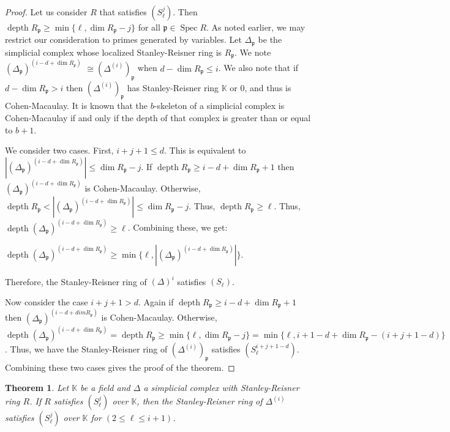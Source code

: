 \documentclass[11pt]{amsart}
\numberwithin{equation}{section}
\newtheorem{theorem}{Theorem}[section]
\theoremstyle{definition}
\theoremstyle{remark}
\newcommand{\Spec}{\operatorname{Spec}}
\newcommand{\depth}{\operatorname{depth}}
\begin{document}
\begin{proof}

Let us consider $R$ that satisfies $(S_\ell^j)$.  Then $\depth R _\mathfrak{p} \geq \min \{ \ell, \dim R_\mathfrak{p} -j \}$ for all $\mathfrak{p} \in \Spec R$.  As noted earlier, we may restrict our consideration to primes generated by variables.  Let $\Delta_\mathfrak{p}$ be the simplicial complex whose localized Stanley-Reisner ring is $R_\mathfrak{p}$.  We note $(\Delta_\mathfrak{p})^{(i-d+\dim R_\mathfrak{p})}$ $\cong (\Delta ^{(i)})_\mathfrak{p}$ when $d-\dim R_\mathfrak{p} \leq i$.  We also note that if $d-\dim R_\mathfrak{p} > i$ then $(\Delta ^{(i)})_\mathfrak{p}$ has Stanley-Reisner ring $\mathbb{K}$ or $0$, and thus is Cohen-Macaulay.  It is known that the $b$-skeleton of a simplicial complex is Cohen-Macaulay if and only if the depth of that complex is greater than or equal to $b+1$.

We consider two cases.  First, $i +j+1 \leq d$.  This is equivalent to $|(\Delta_\mathfrak{p})^{(i-d+\dim R_\mathfrak{p})}| \leq \dim R_\mathfrak{p} -j$.  If $\depth R_\mathfrak{p} \geq i-d+\dim R_\mathfrak{p}+1$ then $(\Delta_\mathfrak{p})^{(i-d+\dim R_\mathfrak{p})}$ is Cohen-Macaulay.  Otherwise, $\depth R_\mathfrak{p} < |(\Delta_\mathfrak{p})^{(i-d+\dim R_\mathfrak{p})}| \leq \dim R_\mathfrak{p} -j$.  Thus, $\depth R_\mathfrak{p} \geq \ell$.  Thus, $\depth (\Delta_\mathfrak{p})^{(i-d+\dim R_\mathfrak{p})} \geq \ell$.  Combining these, we get:

$\depth (\Delta_\mathfrak{p})^{(i-d+\dim R_\mathfrak{p})} \geq \min \{ \ell, |(\Delta_\mathfrak{p})^{(i-d+\dim R_\mathfrak{p})}| \}$.  

Therefore, the Stanley-Reisner ring of $(\Delta)^{i}$ satisfies $(S_\ell)$.

Now consider the case $i +j +1 > d$.  Again if $\depth R_\mathfrak{p} \geq i-d+\dim R_\mathfrak{p}+1$ then $(\Delta_\mathfrak{p})^{(i-d+ dim R_\mathfrak{p})}$ is Cohen-Macaulay.  Otherwise, $\depth (\Delta_\mathfrak{p})^{(i-d+ \dim R_\mathfrak{p})} =\depth R_\mathfrak{p} \geq \min \{ \ell, \dim R_\mathfrak{p} - j \} = \min \{ \ell, i+1-d + \dim R_\mathfrak{p} - (i+j+1-d)\}$.  Thus, we have the Stanley-Reisner ring of $(\Delta ^{(i)})_\mathfrak{p}$ satisfies $(S_\ell^{i+j+1-d})$.  Combining these two cases gives the proof of the theorem.

\end{proof}

\begin{theorem}
Let $\mathbb{K}$ be a field and $\Delta$ a simplicial complex with Stanley-Reisner ring $R$.  If $R$ satisfies $(S_\ell^j)$ over $\mathbb{K}$, then the Stanley-Reisner ring of $\Delta ^{(i)}$ satisfies $(S_\ell^j)$ over $\mathbb{K}$ for $(2  \leq \ell \leq i+1)$.  
\end{theorem}
\end{document}
